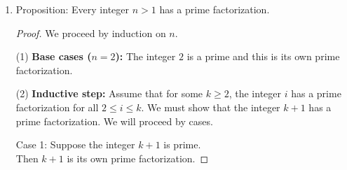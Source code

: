 \documentclass[12pt]{article}
\begin{document}
\begin{enumerate}
First, make sure you understand the statement and crunch a few numbers.

\begin{proof} We proceed by induction on $n$.

\medskip\noindent(1) \textbf{Base cases ($n=0$ and $n=1$):} We know $a_0=1$ and $a_1=4 $ by definition. We check that the closed formula gives the same values: $$a_0=3 \cdot 2^0-2=1 \text{ and } a_1=3 \cdot 2^1-2=4.$$
Thus, the proposition holds for $n=0$ and $n=1.$

\medskip\noindent(2) \textbf{Inductive step:}
Assume that for some $k\geq 1$, the term $a_i$ is equal to $3\cdot 2^i-2$ for all $0\leq i \leq k.$
We must show that the term $a_{k+1}$ is equal to $3\cdot 2^{k+1}-2.$ 

Observe
\hspace*{-.3in}\begin{align*}
  a_{k+1}
  &= 3a_{k}-2a_{k-1}&\text{ definition of } a_{k+1}\\
  &= 3(3\cdot 2^k-2) -2(3\cdot 2^{k-1}-2)& \text{ inductive hypothesis for $k$ and $k-1$}\\
  &= 9\cdot2^k-6-2\cdot 3 \cdot 2^{k-1}+4& \text{ expansion}\\
  &=9\cdot2^k-3 \cdot 2^{k}-6& \text{ combine terms}\\
  &=6\cdot2^k-6& \text{ combine terms}\\
&=3\cdot2^{k+1}k-6&,\\
which is what we needed to show. 
\end{align*}


\end{proof}


\item Proposition: Every integer $n >1$ has a prime factorization.

\begin{proof} We proceed by induction on $n$.

\medskip\noindent(1) \textbf{Base cases ($n=2$):} The integer $2$ is a prime and this is its own prime factorization.

\medskip\noindent(2) \textbf{Inductive step:}
Assume that for some $k\geq 2$, the integer $i$ has a prime factorization for all $2 \leq i \leq k.$
We must show that the integer $k+1$ has a prime factorization.  We will proceed by cases.

Case 1: Suppose the integer $k+1$ is prime.\\
Then $k+1$ is its own prime factorization.


\end{proof}
\end{enumerate}
\end{document}
